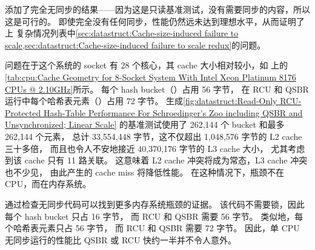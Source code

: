添加了完全无同步的结果——因为这是只读基准测试，没有需要同步的内容，所以这是可行的。
即使完全没有任何同步，性能仍然远未达到理想水平，从而证明了
上
复杂情况列表中\cref{sec:datastruct:Cache-size-induced failure to scale,sec:datastruct:Cache-size-induced failure to scale redux}的问题。

问题在于这个系统的 socket 有 28 个核心，其 cache 大小相对较小，如
上的
\cref{tab:cpu:Cache Geometry for 8-Socket System With Intel Xeon Platinum 8176 CPUs @ 2.10GHz}所示。
每个 hash bucket（）占用 56 字节，
在 RCU 和 QSBR 运行中每个哈希表元素（）占用 72 字节。
生成\cref{fig:datastruct:Read-Only RCU-Protected Hash-Table Performance For Schroedinger's Zoo including QSBR and Unsynchronized; Linear Scale}
的基准测试使用了 262,144 个 bucket 和最多 262,144 个元素，
总计 33,554,448 字节，这不仅超出 1,048,576 字节的 L2 cache 三十多倍，
而且也令人不安地接近 40,370,176 字节的 L3 cache 大小，
尤其考虑到该 cache 只有 11 路关联。
这意味着 L2 cache 冲突将成为常态，L3 cache 冲突也不少见，
由此产生的 cache miss 将降低性能。
在这种情况下，瓶颈不在 CPU，而在内存系统。

通过检查无同步代码可以找到更多内存系统瓶颈的证据。
该代码不需要锁，因此每个 hash bucket 只占 16 字节，
而 RCU 和 QSBR 需要 56 字节。
类似地，每个哈希表元素只占 56 字节，
而 RCU 和 QSBR 需要 72 字节。
因此，单 CPU 无同步运行的性能比 QSBR 或 RCU 快约一半并不令人意外。

